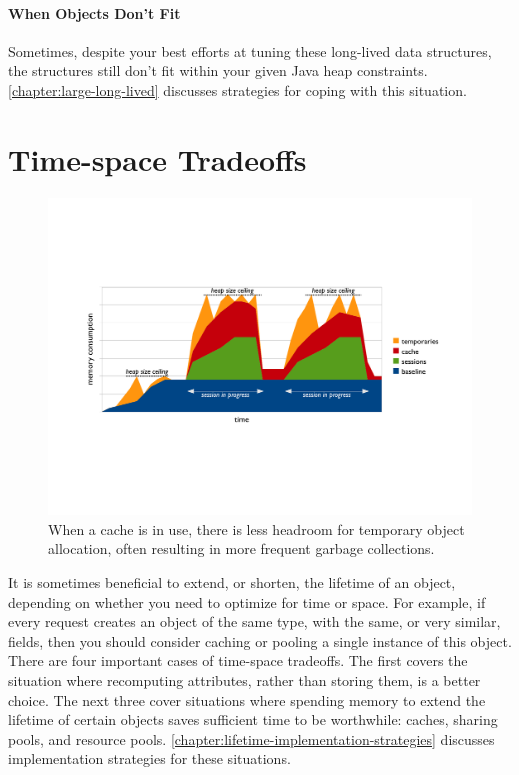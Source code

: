 \paragraph{When Objects Don't Fit}
Sometimes, despite your best efforts at tuning these long-lived data structures,
the structures still don't fit within your given Java heap constraints.
\autoref{chapter:large-long-lived} discusses strategies for coping with this
situation.

\section{Time-space Tradeoffs}
\label{sec:time-space-tradeoffs-pattern}

\begin{figure}[h]  %
	\centering
	\includegraphics[width=\textwidth]{part2/Figures/lifetime/timeline-base-session-temps-with-cache}
	\caption{When a cache is in use, there is less headroom for temporary
	object allocation, often resulting in more frequent garbage collections.}
	\label{fig:timeline-base-session-temps-with-cache}
\end{figure}

It is sometimes beneficial to extend, or shorten, the
lifetime of an object, depending on whether you need to optimize for time or space. For example, if
every request creates an object of the same type, with the same, or very similar, fields, 
then you should consider caching or pooling a single
instance of this object. There are four important cases of time-space tradeoffs.
The first covers the situation where recomputing attributes, rather than storing
them, is a better choice. The next three cover situations where spending memory
to extend the lifetime of certain objects saves sufficient time to be worthwhile:
caches, sharing pools, and resource pools.
\autoref{chapter:lifetime-implementation-strategies} discusses implementation
strategies for these situations.

